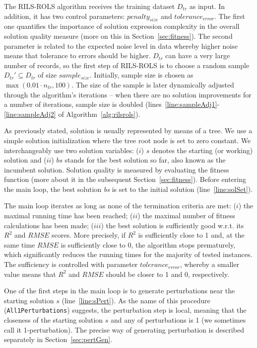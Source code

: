 \documentclass{bmcart}
\begin{document}
The \textsc{RILS}-\textsc{ROLS} algorithm receives the training dataset $D_{tr}$ as input. In addition, it has two control parameters: $penalty_{size}$ and $tolerance_{error}$. The first one quantifies the importance of solution expression complexity in the overall solution quality measure (more on this in Section~\ref{sec:fitness}). The second parameter is related to the expected noise level in data whereby higher noise means that tolerance to errors should be higher.
$D_{tr}$ can have a very large number of records, so the first step of \textsc{RILS}-\textsc{ROLS}  is to choose a random sample $D_{tr}' \subseteq D_{tr}$ of size $sample_{size}$. Initially, sample size is chosen as $\max(0.01 \cdot n_{tr}, 100)$. The size of the sample is later dynamically adjusted through the algorithm's iterations -- when there are no solution improvements for a number of iterations, sample size is doubled (lines~\ref{line:sampleAdj1}-\ref{line:sampleAdj2} of Algorithm~\ref{alg:rilsrols}).

As previously stated, solution is usually represented by means of a tree. We use a simple solution initialization where the tree root node is set to zero constant. We interchangeably use two solution variables: ($i$) $s$ denotes the starting (or working) solution and ($ii$) $bs$ stands for the best solution so far, also known as the incumbent solution. Solution quality is measured by evaluating the fitness function (more about it in the subsequent Section~\ref{sec:fitness}). Before entering the main loop, the best solution \emph{bs} is set to the initial solution (line~\ref{line:solSet}). 


The main loop iterates as long as none of the termination criteria are met: ($i$) the maximal running time has been reached; ($ii$) the maximal number of fitness calculations has been made; ($iii$) the best solution is sufficiently good 
w.r.t. its $R^2$ and $RMSE$ scores. More precisely, if $R^2$ is sufficiently close to 1 and, at the same time $RMSE$ is sufficiently close to 0, the algorithm stops prematurely, which significantly reduces the running times for the majority of tested instances.
The sufficiency is controlled with parameter $tolerance_{error}$, whereby a smaller value means that $R^2$ and $RMSE$ should be closer to 1 and 0, respectively. 


One of the first steps in the main loop is to generate perturbations near the starting solution $s$ (line~\ref{line:sPert}). 
As the name of this procedure (\texttt{All1Perturbations}) suggests, the perturbation step is local, meaning that the closeness of the starting solution $s$ and any of perturbations is 1 (we sometimes call it 1-perturbation). The precise way of generating perturbation is described separately in Section~\ref{sec:pertGen}. 
\end{document}
